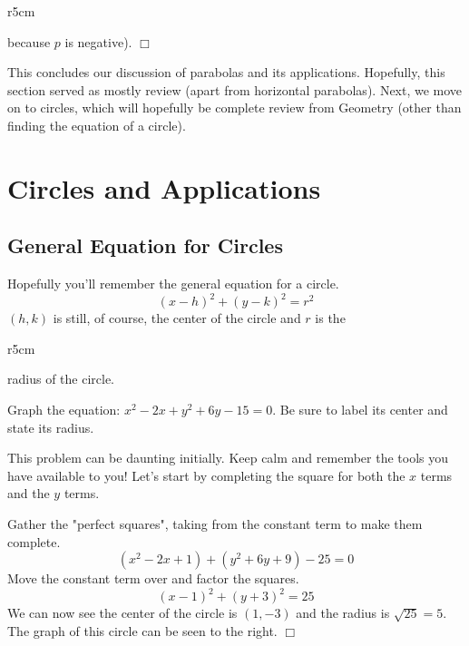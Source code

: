 \documentclass[../book.tex]{subfiles}
\begin{document}
\begin{wrapfigure}{r}{5cm}
\end{wrapfigure}

\noindent because $p$ is negative). $\Box$

This concludes our discussion of parabolas and its applications.  Hopefully, this section served as mostly review (apart from horizontal parabolas).  Next, we move on to circles, which will hopefully be complete review from Geometry (other than finding the equation of a circle).
\section{Circles and Applications}
\subsection{General Equation for Circles}
\noindent Hopefully you'll remember the general equation for a circle.
$$ (x-h)^2 + (y-k)^2 = r^2 $$
$(h,k)$ is still, of course, the center of the circle and $r$ is the

\begin{wrapfigure}{r}{5cm}
\end{wrapfigure}

\noindent radius of the circle.

\begin{example}
Graph the equation: $x^2-2x+y^2+6y-15=0$.  Be sure to label its center and state its radius.
\end{example}
\begin{solution}
This problem can be daunting initially.  Keep calm and remember the tools you have available to you!  Let's start by completing the square for both the $x$ terms and the $y$ terms.

Gather the "perfect squares", taking from the constant term to make them complete.
$$ (x^2-2x+1)+(y^2+6y+9)-25=0 $$
Move the constant term over and factor the squares.
$$ (x-1)^2+(y+3)^2=25 $$
We can now see the center of the circle is $(1,-3)$ and the radius is $\sqrt{25}=5$.  The graph of this circle can be seen to the right. $\Box$
\end{solution}
\end{document}
